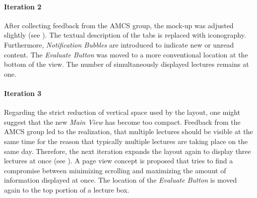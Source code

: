 \paragraph{Iteration 2}
After collecting feedback from the AMCS group, the mock-up was adjusted slightly (see ). The textual description of the tabs is replaced with iconography. Furthermore, \emph{Notification Bubbles} are introduced to indicate new or unread content. The \emph{Evaluate Button} was moved to a more conventional location at the bottom of the view. The number of simultaneously displayed lectures remains at one.

\paragraph{Iteration 3}
Regarding the strict reduction of vertical space used by the layout, one might suggest that the new \emph{Main View} has become too compact.
Feedback from the AMCS group led to the realization, that multiple lectures should be visible at the same time for the reason that typically multiple lectures are taking place on the same day.
Therefore, the next iteration expands the layout again to display three lectures at once (see ). A page view concept is proposed that tries to find a compromise between minimizing scrolling and maximizing the amount of information displayed at once. The location of the \emph{Evaluate Button} is moved again to the top portion of a lecture box.

